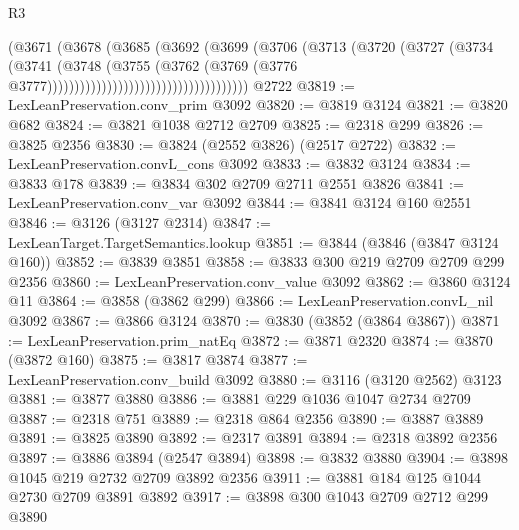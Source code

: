 \begin{lexlean}{R3}
\begin{coremodule}
                                              (@3671
                                                (@3678
                                                  (@3685
                                                    (@3692
                                                      (@3699
                                                        (@3706
                                                          (@3713
                                                            (@3720
                                                              (@3727
                                                                (@3734
                                                                  (@3741
                                                                    (@3748
                                                                      (@3755
                                                                        (@3762
                                                                          (@3769
                                                                            (@3776
                                                                              @3777)))))))))))))))))))))))))))))))))))))
    @2722
@3819 := LexLeanPreservation.conv_prim @3092
@3820 := @3819 @3124
@3821 := @3820 @682
@3824 := @3821 @1038 @2712 @2709
@3825 := @2318 @299
@3826 := @3825 @2356
@3830 := @3824 (@2552 @3826) (@2517 @2722)
@3832 := LexLeanPreservation.convL_cons @3092
@3833 := @3832 @3124
@3834 := @3833 @178
@3839 := @3834 @302 @2709 @2711 @2551 @3826
@3841 := LexLeanPreservation.conv_var @3092
@3844 := @3841 @3124 @160 @2551
@3846 := @3126 (@3127 @2314)
@3847 := LexLeanTarget.TargetSemantics.lookup
@3851 := @3844 (@3846 (@3847 @3124 @160))
@3852 := @3839 @3851
@3858 := @3833 @300 @219 @2709 @2709 @299 @2356
@3860 := LexLeanPreservation.conv_value @3092
@3862 := @3860 @3124 @11
@3864 := @3858 (@3862 @299)
@3866 := LexLeanPreservation.convL_nil @3092
@3867 := @3866 @3124
@3870 := @3830 (@3852 (@3864 @3867))
@3871 := LexLeanPreservation.prim_natEq
@3872 := @3871 @2320
@3874 := @3870 (@3872 @160)
@3875 := @3817 @3874
@3877 := LexLeanPreservation.conv_build @3092
@3880 := @3116 (@3120 @2562) @3123
@3881 := @3877 @3880
@3886 := @3881 @229 @1036 @1047 @2734 @2709
@3887 := @2318 @751
@3889 := @2318 @864 @2356
@3890 := @3887 @3889
@3891 := @3825 @3890
@3892 := @2317 @3891
@3894 := @2318 @3892 @2356
@3897 := @3886 @3894 (@2547 @3894)
@3898 := @3832 @3880
@3904 := @3898 @1045 @219 @2732 @2709 @3892 @2356
@3911 := @3881 @184 @125 @1044 @2730 @2709 @3891 @3892
@3917 := @3898 @300 @1043 @2709 @2712 @299 @3890

\end{coremodule}
\end{lexlean}
